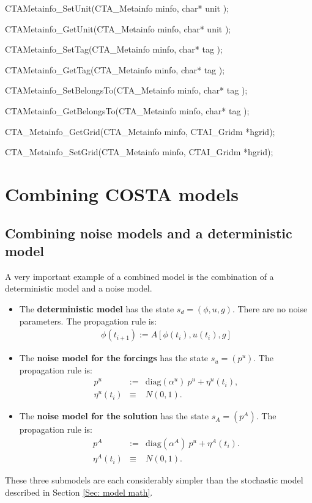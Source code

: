 \documentclass[a4paper,12pt]{article}
\begin{document}
CTA\-Metainfo\_SetUnit(CTA\_Metainfo minfo, char* unit );

CTA\-Metainfo\_GetUnit(CTA\_Metainfo minfo, char* unit );

CTA\-Metainfo\_SetTag(CTA\_Metainfo minfo, char* tag );

CTA\-Metainfo\_GetTag(CTA\_Metainfo minfo, char* tag );

CTA\-Metainfo\_SetBelongsTo(CTA\_Metainfo minfo, char* tag );

CTA\-Metainfo\_GetBelongsTo(CTA\_Metainfo minfo, char* tag );

CTA\_Metainfo\_GetGrid(CTA\_Metainfo minfo, CTAI\_Gridm *hgrid);

CTA\_Metainfo\_SetGrid(CTA\_Metainfo minfo, CTAI\_Gridm *hgrid);



 


\section{Combining COSTA models}
\subsection{Combining noise models and a deterministic model}
\label{Sec: example combi}
A very important example of a combined model is the combination of a 
deterministic model and a noise model. 
\begin{itemize}
\item The {\bf deterministic model} has the state $s_d = (\phi,u,g)$. There are
      no noise parameters.
      The propagation rule is:
\begin{eqnarray}
      \phi(t_{i+1}) := A[\phi(t_i),u(t_i),g]
\end{eqnarray}
\item The {\bf noise model for the forcings} has the state $s_u = (p^u)$. 
      The propagation rule is:
\begin{eqnarray} 
   p^u &:=& \mbox{diag}(\alpha^u) ~ p^u + \eta^u(t_i),
\nonumber \\
   \eta^u(t_i) &\equiv& N(0,1).
\end{eqnarray}
\item The {\bf noise model for the solution} has the state $s_A = (p^A)$. 
      The propagation rule is:
\begin{eqnarray} 
   p^A &:=& \mbox{diag}(\alpha^A) ~ p^u + \eta^A(t_i).
\nonumber \\
   \eta^A(t_i) &\equiv& N(0,1).
\end{eqnarray}
\end{itemize}
These three submodels are each considerably simpler than the stochastic
model described in Section \ref{Sec: model math}.
\end{document}
